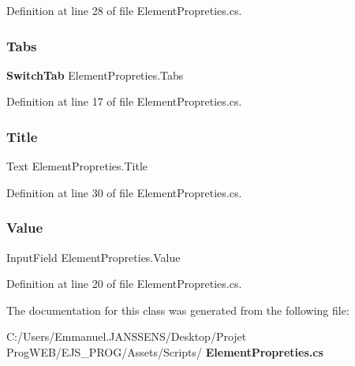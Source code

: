 Definition at line 28 of file Element\+Propreties.\+cs.

\mbox{\label{class_element_propreties_ad7702589fe557628abd15faed703cd4b}} 
\subsubsection{Tabs}
{\footnotesize\ttfamily \textbf{ Switch\+Tab} Element\+Propreties.\+Tabs}



Definition at line 17 of file Element\+Propreties.\+cs.

\mbox{\label{class_element_propreties_a1394f8342cd80af642e850f35e96a458}} 
\subsubsection{Title}
{\footnotesize\ttfamily Text Element\+Propreties.\+Title}



Definition at line 30 of file Element\+Propreties.\+cs.

\mbox{\label{class_element_propreties_a97c302d86c16226b86163d0b463c7865}} 
\subsubsection{Value}
{\footnotesize\ttfamily Input\+Field Element\+Propreties.\+Value\hspace{0.3cm}{\ttfamily [protected]}}



Definition at line 20 of file Element\+Propreties.\+cs.



The documentation for this class was generated from the following file\+:\begin{DoxyCompactItemize}
\item 
C\+:/\+Users/\+Emmanuel.\+J\+A\+N\+S\+S\+E\+N\+S/\+Desktop/\+Projet Prog\+W\+E\+B/\+E\+J\+S\+\_\+\+P\+R\+O\+G/\+Assets/\+Scripts/\textbf{ Element\+Propreties.\+cs}\end{DoxyCompactItemize}
